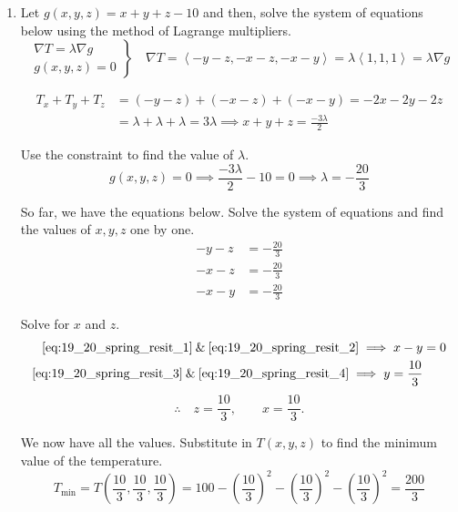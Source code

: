 \documentclass[a4paper, 12pt]{article}
\renewcommand{\headrulewidth}{0pt}
\begin{document}
\newpage
\pagestyle{fancy}
\renewcommand{\headrulewidth}{1pt}


\begin{enumerate}[leftmargin=*,label=\textbf{\arabic*.}]
\item Let $g(x,y,z)=x+y+z-10$ and then, solve the system of equations below using the method of Lagrange multipliers.
\[
\left.
\begin{array}{ll}
\nabla T =\lambda \nabla g\\[1em]
g(x,y,z) = 0
\end{array}
\right\}\quad
\nabla T = \left\langle-y-z,-x-z,-x-y\right\rangle=\lambda\left\langle1,1,1\right\rangle= \lambda\nabla g
\]

\vspace{-1em}
\begin{align*}T_x+T_y + T_z&=(-y-z) +(-x-z) +(-x-y)=-2x-2y-2z\\[1em]&=\lambda+\lambda+\lambda=3\lambda\implies x+y+z=\frac{-3\lambda}{2}\end{align*}

Use the constraint to find the value of $\lambda$.
\[g(x,y,z) = 0 \implies \frac{-3\lambda}{2}-10=0\implies \lambda=-\frac{20}{3}\]

So far, we have the equations below. Solve the system of equations and find the values of $x,y,z$ one by one.
\begin{align}
-y-z &= -\frac{20}{3}
\label{eq:19_20_spring_resit_1}\\
-x-z &= -\frac{20}{3}
\label{eq:19_20_spring_resit_2}\\
-x-y &= -\frac{20}{3}
\label{eq:19_20_spring_resit_3}
\end{align}

Solve for $x$ and $z$.
\begin{align}
\eqref{eq:19_20_spring_resit_1} \:\&\:
\eqref{eq:19_20_spring_resit_2}
\implies x-y &= 0
\label{eq:19_20_spring_resit_4}\\
\eqref{eq:19_20_spring_resit_3} \:\&\:
\eqref{eq:19_20_spring_resit_4}
\implies y = \frac{10}{3}
\label{eq:19_20_spring_resit_5}\nonumber
\end{align}
\[\therefore\quad z=\frac{10}{3},\qquad x=\frac{10}{3}.\]

We now have all the values. Substitute in $T(x,y,z)$ to find the minimum value of the temperature.
\[T_{\text{min}}=T\left(\frac{10}{3},\frac{10}{3},\frac{10}{3}\right)=100-\left(\frac{10}{3}\right)^2-\left(\frac{10}{3}\right)^2-\left(\frac{10}{3}\right)^2=\boxed{\frac{200}{3}}\]


\end{enumerate}
\end{document}
